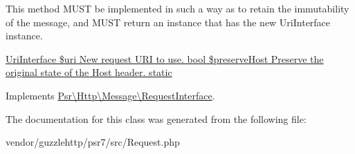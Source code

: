 This method M\+U\+ST be implemented in such a way as to retain the immutability of the message, and M\+U\+ST return an instance that has the new Uri\+Interface instance.

\hyperlink{}{Uri\+Interface \$uri New request U\+RI to use.  bool \$preserve\+Host Preserve the original state of the Host header.  static }

Implements \hyperlink{interfacePsr_1_1Http_1_1Message_1_1RequestInterface_a17c5215ee9c9cf32304834d9093d3291}{Psr\textbackslash{}\+Http\textbackslash{}\+Message\textbackslash{}\+Request\+Interface}.



The documentation for this class was generated from the following file\+:\begin{DoxyCompactItemize}
\item 
vendor/guzzlehttp/psr7/src/Request.\+php\end{DoxyCompactItemize}
